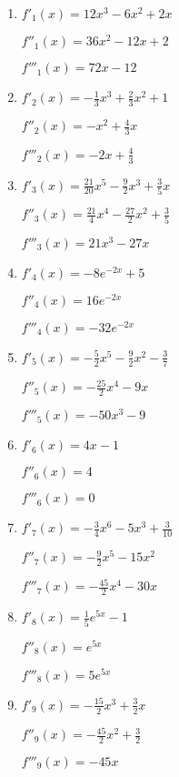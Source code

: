 \begin{Answer}[ref=hoehereAbleitungenA1]

	\begin{enumerate}[label=\alph*)]
		\item \(f'_1(x)=12x^3-6x^2+2x\)

		\(f''_1(x)=36x^2-12x+2\)

		\(f'''_1(x)=72x-12\)

		\item \(f'_2(x)=-\frac{1}{3}x^3+\frac{2}{3}x^2+1\)

		\(f''_2(x)=-x^2+\frac{4}{3}x\)

		\(f'''_2(x)=-2x+\frac{4}{3}\)

		\item \(f'_3(x)=\frac{21}{20}x^5-\frac{9}{2}x^3+\frac{3}{5}x\)

		\(f''_3(x)=\frac{21}{4}x^4-\frac{27}{2}x^2+\frac{3}{5}\)

		\(f'''_3(x)=21x^3-27x\)

		\item \(f'_4(x)=-8e^{-2x}+5\)

		\(f''_4(x)=16e^{-2x}\)

		\(f'''_4(x)=-32e^{-2x}\)

		\item \(f'_5(x)=-\frac{5}{2}x^5-\frac{9}{2}x^2-\frac{3}{7}\)

		\(f''_5(x)=-\frac{25}{2}x^4-9x\)

		\(f'''_5(x)=-50x^3-9\)

		\item \(f'_6(x)=4x-1\)

		\(f''_6(x)=4\)

		\(f'''_6(x)=0\)

		\item \(f'_7(x)=-\frac{3}{4}x^6-5x^3+\frac{3}{10}\)

		\(f''_7(x)=-\frac{9}{2}x^5-15x^2\)

		\(f'''_7(x)=-\frac{45}{2}x^4-30x\)

		\item \(f'_8(x)=\frac{1}{5}e^{5x}-1\)

		\(f''_8(x)=e^{5x}\)

		\(f'''_8(x)=5e^{5x}\)

		\item \(f'_9(x)=-\frac{15}{2}x^3+\frac{3}{2}x\)

		\(f''_9(x)=-\frac{45}{2}x^2+\frac{3}{2}\)

		\(f'''_9(x)=-45x\)


\end{enumerate}
\end{Answer}
